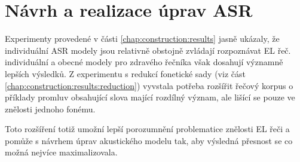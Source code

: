 \chapter{Návrh a realizace úprav ASR}
\label{chap:realisation}

Experimenty provedené v části \ref{chap:construction:results} jasně ukázaly, že individuální ASR modely jsou relativně obstojně zvládají rozpoznávat EL řeč. individuální a obecné modely pro zdravého řečníka však dosahují významně lepších výsledků. Z experimentu s redukcí fonetické sady (viz část \ref{chap:construction:results:reduction}) vyvstala potřeba rozšířit řečový korpus o příklady promluv obsahující slova mající rozdílný význam, ale lišící se pouze ve znělosti jednoho fonému.

Toto rozšíření totiž umožní lepší porozumnění problematice znělosti EL řeči a pomůže s návrhem úprav akustického modelu tak, aby výsledná přesnost se co možná nejvíce maximalizovala.










